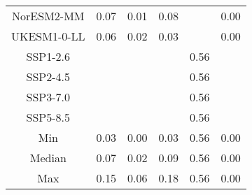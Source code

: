 \begin{table*}[t]
\begin{tabular}{c|rrr|rr}
NorESM2-MM & 0.07 & 0.01 & 0.08 &  & 0.00 \\
UKESM1-0-LL & 0.06 & 0.02 & 0.03 &  & 0.00 \\
SSP1-2.6 &  &  &  & 0.56 &  \\
SSP2-4.5 &  &  &  & 0.56 &  \\
SSP3-7.0 &  &  &  & 0.56 &  \\
SSP5-8.5 &  &  &  & 0.56 &  \\
\midrule
Min & 0.03 & 0.00 & 0.03 & 0.56 & 0.00 \\
Median & 0.07 & 0.02 & 0.09 & 0.56 & 0.00 \\
Max & 0.15 & 0.06 & 0.18 & 0.56 & 0.00 \\
\bottomrule
\end{tabular}
\end{table*}
